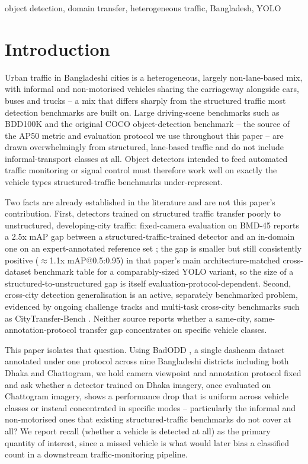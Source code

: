 \documentclass[conference,a4paper]{IEEEtran}
\begin{document}
\begin{IEEEkeywords}
object detection, domain transfer, heterogeneous traffic, Bangladesh, YOLO
\end{IEEEkeywords}

\section{Introduction}
\label{sec:intro}

Urban traffic in Bangladeshi cities is a heterogeneous, largely non-lane-based mix,
with informal and non-motorised vehicles sharing the carriageway alongside cars, buses
and trucks -- a mix that differs sharply from the structured traffic most detection
benchmarks are built on.
Large driving-scene benchmarks such as BDD100K \cite{yu2020bdd100k} and the original
COCO object-detection benchmark \cite{lin2014coco} -- the source of the AP50 metric
and evaluation protocol we use throughout this paper -- are drawn overwhelmingly from
structured, lane-based traffic and do not include informal-transport classes at all.
Object detectors intended to feed automated traffic monitoring or signal control must
therefore work well on exactly the vehicle types structured-traffic benchmarks
under-represent.

Two facts are already established in the literature and are not this paper's
contribution. First, detectors trained on structured traffic transfer poorly to
unstructured, developing-city traffic: fixed-camera evaluation on BMD-45 reports a 2.5x
mAP gap between a structured-traffic-trained detector and an in-domain one on an
expert-annotated reference set \cite{sharma2026bmd45}; the gap is smaller but still
consistently positive ($\approx$1.1x mAP@0.5:0.95) in that paper's main
architecture-matched cross-dataset benchmark table for a comparably-sized YOLO variant,
so the size of a structured-to-unstructured gap is itself evaluation-protocol-dependent.
Second, cross-city detection generalisation is an active,
separately benchmarked problem, evidenced by ongoing challenge tracks
\cite{aicitychallenge2026} and multi-task cross-city benchmarks such as
CityTransfer-Bench \cite{qian2026citygen}. Neither source reports whether a same-city,
same-annotation-protocol transfer gap concentrates on specific vehicle classes.

This paper isolates that question. Using BadODD \cite{baig2024badodd}, a single
dashcam dataset annotated under one protocol across nine Bangladeshi districts
including both Dhaka and Chattogram, we hold camera viewpoint and annotation protocol
fixed and ask whether a detector trained on Dhaka imagery, once evaluated on
Chattogram imagery, shows a performance drop that is uniform across vehicle classes or
instead concentrated in specific modes -- particularly the informal and non-motorised ones
that existing structured-traffic benchmarks do not cover at all? We report recall
(whether a vehicle is detected at all) as the primary quantity of interest, since a
missed vehicle is what would later bias a classified count in a downstream
traffic-monitoring pipeline.
\end{document}
